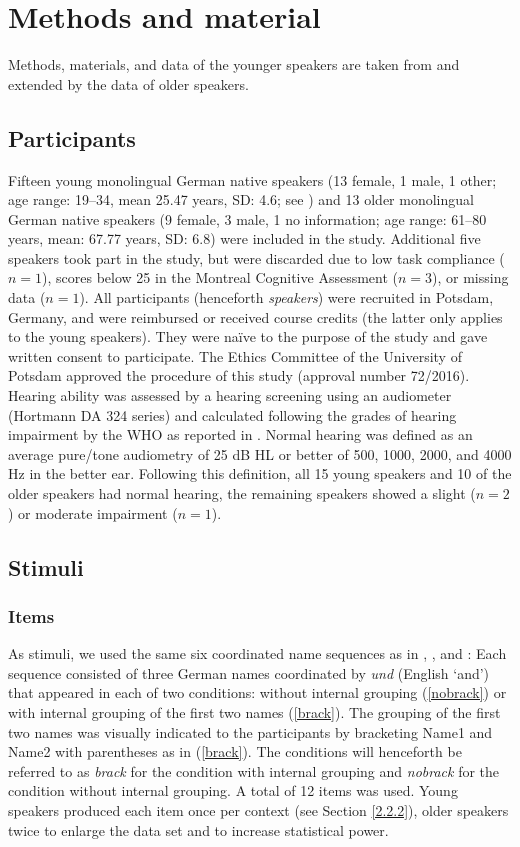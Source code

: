 \documentclass[output=paper]{langscibook}
\begin{document}
\section{Methods and material}
Methods, materials, and data of the younger speakers are taken from  \citet{huttenlauchetal2021} and extended by the data of older speakers.
\subsection{Participants}
Fifteen young monolingual German native speakers (13 female, 1 male, 1 other; age range: 19--34, mean 25.47 years, SD: 4.6; see \citealt{huttenlauchetal2021}) and 13 older monolingual German native speakers (9 female, 3 male, 1 no information; age range: 61--80 years, mean: 67.77 years, SD: 6.8) were included in the study. Additional five speakers took part in the study, but were discarded due to low task compliance ($n=1$), scores below 25 in the Montreal Cognitive Assessment \citep{moca2005} ($n=3$), or missing data ($n=1$). All participants (henceforth \textit{speakers}) were recruited in Potsdam, Germany, and were reimbursed or received course credits (the latter only applies to the young speakers). They were na\"ive to the purpose of the study and gave written consent to participate. The Ethics Committee of the University of Potsdam approved the procedure of this study (approval number 72/2016). Hearing ability was assessed by a hearing screening using an audiometer (Hortmann DA 324 series) and calculated following the grades of hearing impairment by the WHO as reported in \citet{who_hearing_2019}. Normal hearing was defined as an average pure\-/tone audiometry of 25 dB HL or better of 500, 1000, 2000, and 4000 Hz in the better ear. Following this definition, all 15 young speakers and 10 of the older speakers had normal hearing, the remaining speakers showed a slight ($n=2$) or moderate impairment ($n=1$).

\subsection{Stimuli}
\subsubsection{Items}
As stimuli, we used the same six coordinated name sequences as in \citet{holzgrefe-lang_how_2016}, \citet{huttenlauchetal2021}, and : Each sequence consisted of three German names coordinated by \textit{und} (English `and') that appeared in each of two conditions: without internal grouping (\ref{nobrack}) or with internal grouping of the first two names (\ref{brack}). The grouping of the first two names was visually indicated to the participants by bracketing Name1 and Name2 with parentheses as in (\ref{brack}). The conditions will henceforth be referred to as \textit{brack} for the condition with internal grouping and \textit{nobrack} for the condition without internal grouping. A total of 12 items was used. Young speakers produced each item once per context (see Section \ref{2.2.2}), older speakers twice to enlarge the data set and to increase statistical power.
\end{document}
